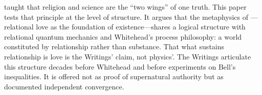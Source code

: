 \AbdulBaha taught that religion and science are the ``two wings'' of one truth. This paper tests that principle at the level of structure. It argues that the \Bahai metaphysics of \mahabbat---relational love as the foundation of existence---shares a logical structure with relational quantum mechanics and Whitehead's process philosophy: a world constituted by relationship rather than substance. That what sustains relationship is love is the Writings' claim, not physics'. The Writings articulate this structure decades before Whitehead and before experiments on Bell's inequalities. It is offered not as proof of supernatural authority but as documented independent convergence.
